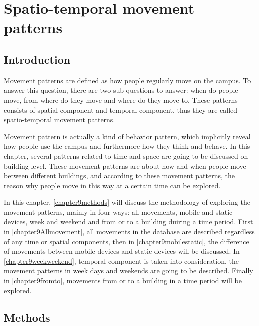 \chapter{Spatio-temporal movement patterns}\label{hernoemen}


\section{Introduction}
Movement patterns are defined as how people regularly move on the campus. To answer this question, there are two sub questions to answer: when do people move, from where do they move and where do they move to. These patterns consists of spatial component and temporal component, thus they are called spatio-temporal movement patterns.

Movement pattern is actually a kind of behavior pattern, which implicitly reveal how people use the campus and furthermore how they think and behave. In this chapter, several patterns related to time and space are going to be discussed on building level. These movement patterns are about how and when  people move between different buildings, and according to these movement patterns, the reason why people move in this way at a certain time can be explored.

In this chapter, \autoref{chapter9methods} will discuss the methodology of exploring the movement patterns, mainly in four ways: all movements, mobile and static devices, week and weekend and from or to a building duiring a time period. First in \autoref{chapter9Allmovement}, all movements in the database are described regardless of any time or spatial components, then in \autoref{chapter9mobilestatic}, the difference of movements between mobile devices and static devices will be discussed. In \autoref{chapter9weekweekend}, temporal component is taken into consideration, the movement patterns in week days and weekends are going to be described. Finally in \autoref{chapter9fromto}, movements from or to a building in a time period will be explored. 

\section{Methods}\label{chapter9methods}

